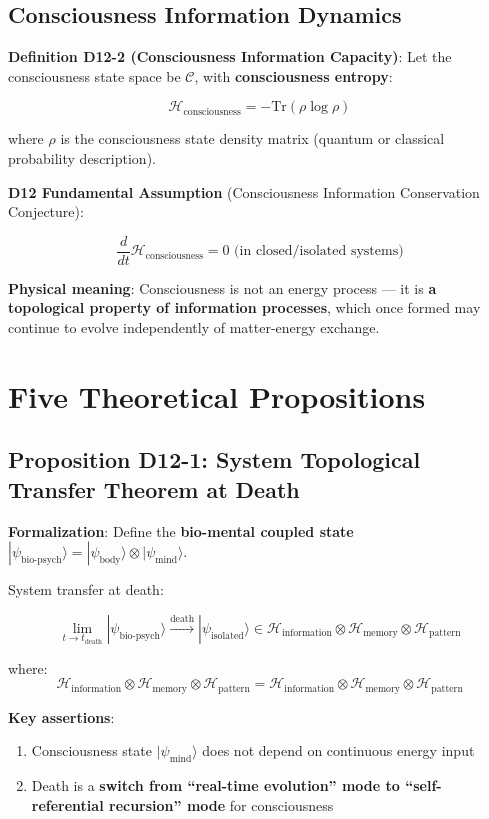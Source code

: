 \documentclass[12pt,a4paper]{article}
\newcommand{\calC}{\mathcal{C}}
\newcommand{\Hc}{\mathcal{H}_{\text{consciousness}}}
\newcommand{\Hinf}{\mathcal{H}_{\text{information}}}
\newcommand{\Hmem}{\mathcal{H}_{\text{memory}}}
\newcommand{\Hpat}{\mathcal{H}_{\text{pattern}}}
\begin{document}
\subsection{Consciousness Information Dynamics}

\textbf{Definition D12-2 (Consciousness Information Capacity)}: Let the consciousness state space be $\calC$, with \textbf{consciousness entropy}:

$$\Hc = -\text{Tr}(\rho \log \rho)$$

where $\rho$ is the consciousness state density matrix (quantum or classical probability description).

\textbf{D12 Fundamental Assumption} (Consciousness Information Conservation Conjecture):

$$\frac{d}{dt} \Hc = 0 \text{ (in closed/isolated systems)}$$

\textbf{Physical meaning}: Consciousness is not an energy process --- it is \textbf{a topological property of information processes}, which once formed may continue to evolve independently of matter-energy exchange.

\section{Five Theoretical Propositions}

\subsection{Proposition D12-1: System Topological Transfer Theorem at Death}

\textbf{Formalization}: Define the \textbf{bio-mental coupled state} $|\psi_{\text{bio-psych}}\rangle = |\psi_{\text{body}}\rangle \otimes |\psi_{\text{mind}}\rangle$.

System transfer at death:

$$\lim_{t \to t_{\text{death}}} |\psi_{\text{bio-psych}}\rangle \xrightarrow{\text{death}} |\psi_{\text{isolated}}\rangle \in \Hinf \otimes \Hmem \otimes \Hpat$$

where:
$$\Hinf \otimes \Hmem \otimes \Hpat = \mathcal{H}_{\text{information}} \otimes \mathcal{H}_{\text{memory}} \otimes \mathcal{H}_{\text{pattern}}$$

\textbf{Key assertions}:
\begin{enumerate}
    \item Consciousness state $|\psi_{\text{mind}}\rangle$ does not depend on continuous energy input
    \item Death is a \textbf{switch from ``real-time evolution'' mode to ``self-referential recursion'' mode} for consciousness
\end{enumerate}
\end{document}
